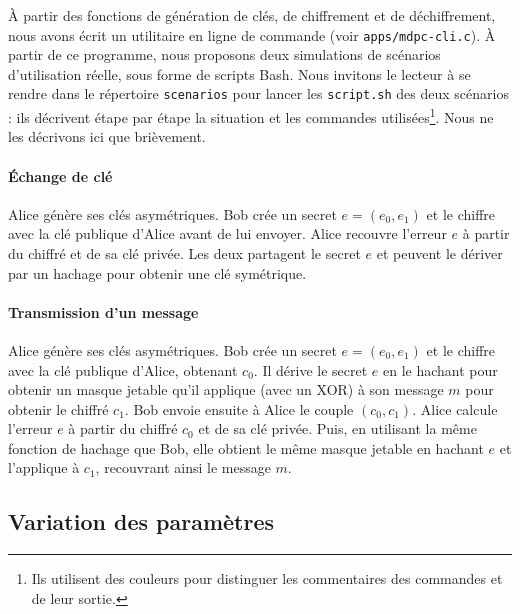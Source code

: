 \documentclass[11pt,a4paper]{article}
\begin{document}
À partir des fonctions de génération de clés, de chiffrement et de
déchiffrement, nous avons écrit un utilitaire en ligne de commande (voir
\texttt{apps/mdpc-cli.c}). À partir de ce programme, nous proposons deux
simulations de scénarios d'utilisation réelle, sous forme de scripts Bash.
Nous invitons le lecteur à se rendre dans le répertoire \texttt{scenarios} pour
lancer les \texttt{script.sh} des deux scénarios : ils décrivent étape par étape
la situation et les commandes utilisées\footnote{Ils utilisent des couleurs pour
distinguer les commentaires des commandes et de leur sortie.}.
Nous ne les décrivons ici que brièvement.

\paragraph{Échange de clé}
Alice génère ses clés asymétriques. Bob crée un secret $e = (e_0, e_1)$ et le
chiffre avec la clé publique d'Alice avant de lui envoyer.
Alice recouvre l'erreur $e$ à partir du chiffré et de sa clé privée.
Les deux partagent le secret $e$ et peuvent le dériver par un hachage pour
obtenir une clé symétrique.

\paragraph{Transmission d'un message}
Alice génère ses clés asymétriques. Bob crée un secret $e = (e_0, e_1)$ et le
chiffre avec la clé publique d'Alice, obtenant $c_0$.
Il dérive le secret $e$ en le hachant pour obtenir un masque jetable qu'il
applique (avec un XOR) à son message $m$ pour obtenir le chiffré $c_1$.
Bob envoie ensuite à Alice le couple $(c_0, c_1)$.
Alice calcule l'erreur $e$ à partir du chiffré $c_0$ et de sa clé privée.
Puis, en utilisant la même fonction de hachage que Bob, elle obtient le même
masque jetable en hachant $e$ et l'applique à $c_1$, recouvrant ainsi le message
$m$.

\subsection{Variation des paramètres}
\end{document}
